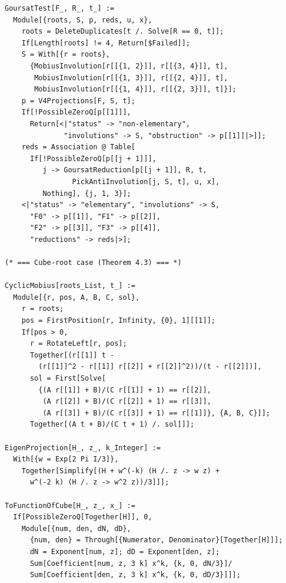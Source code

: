 \documentclass[11pt,a4paper]{article}
\theoremstyle{plain}
\theoremstyle{definition}
\theoremstyle{remark}
\begin{document}
\begin{lstlisting}
GoursatTest[F_, R_, t_] :=
  Module[{roots, S, p, reds, u, x},
    roots = DeleteDuplicates[t /. Solve[R == 0, t]];
    If[Length[roots] != 4, Return[$Failed]];
    S = With[{r = roots},
      {MobiusInvolution[r[[{1, 2}]], r[[{3, 4}]], t],
       MobiusInvolution[r[[{1, 3}]], r[[{2, 4}]], t],
       MobiusInvolution[r[[{1, 4}]], r[[{2, 3}]], t]}];
    p = V4Projections[F, S, t];
    If[!PossibleZeroQ[p[[1]]],
      Return[<|"status" -> "non-elementary",
              "involutions" -> S, "obstruction" -> p[[1]]|>]];
    reds = Association @ Table[
      If[!PossibleZeroQ[p[[j + 1]]],
         j -> GoursatReduction[p[[j + 1]], R, t,
                PickAntiInvolution[j, S, t], u, x],
         Nothing], {j, 1, 3}];
    <|"status" -> "elementary", "involutions" -> S,
      "F0" -> p[[1]], "F1" -> p[[2]],
      "F2" -> p[[3]], "F3" -> p[[4]],
      "reductions" -> reds|>];

(* === Cube-root case (Theorem 4.3) === *)

CyclicMobius[roots_List, t_] :=
  Module[{r, pos, A, B, C, sol},
    r = roots;
    pos = FirstPosition[r, Infinity, {0}, 1][[1]];
    If[pos > 0,
      r = RotateLeft[r, pos];
      Together[(r[[1]] t -
        (r[[1]]^2 - r[[1]] r[[2]] + r[[2]]^2))/(t - r[[2]])],
      sol = First[Solve[
        {(A r[[1]] + B)/(C r[[1]] + 1) == r[[2]],
         (A r[[2]] + B)/(C r[[2]] + 1) == r[[3]],
         (A r[[3]] + B)/(C r[[3]] + 1) == r[[1]]}, {A, B, C}]];
      Together[(A t + B)/(C t + 1) /. sol]]];

EigenProjection[H_, z_, k_Integer] :=
  With[{w = Exp[2 Pi I/3]},
    Together[Simplify[(H + w^(-k) (H /. z -> w z) +
      w^(-2 k) (H /. z -> w^2 z))/3]]];

ToFunctionOfCube[H_, z_, x_] :=
  If[PossibleZeroQ[Together[H]], 0,
    Module[{num, den, dN, dD},
      {num, den} = Through[{Numerator, Denominator}[Together[H]]];
      dN = Exponent[num, z]; dD = Exponent[den, z];
      Sum[Coefficient[num, z, 3 k] x^k, {k, 0, dN/3}]/
      Sum[Coefficient[den, z, 3 k] x^k, {k, 0, dD/3}]]];


\end{lstlisting}
\end{document}

